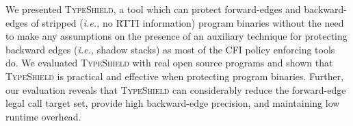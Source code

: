 
We presented \textsc{TypeShield}, 
a tool which can protect forward-edges and backward-edges 
of stripped (\textit{i.e.,} no RTTI information) program binaries without the need to make any assumptions
on the presence of an auxiliary technique for protecting backward edges (\textit{i.e.,} shadow stacks) as most 
of the CFI policy enforcing tools do.
We evaluated
\textsc{TypeShield} with real open source programs and shown that \textsc{TypeShield} 
is practical and effective when protecting program binaries.
Further, our evaluation reveals that \textsc{TypeShield} can considerably reduce the forward-edge legal 
call target set, provide high backward-edge precision, and maintaining low runtime overhead.


